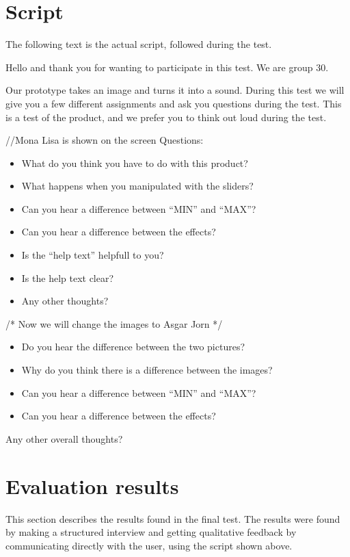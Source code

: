 \section{Script}
The following text is the actual script, followed during the test.

Hello and thank you for wanting to participate in this test. We are group 30.

Our prototype takes an image and turns it into a sound. During this test we will give you a few different assignments and ask you questions during the test. This is a test of the product, and we prefer you to think out loud during the test.

//Mona Lisa is shown on the screen 
Questions: 


\begin{itemize}
\item What do you think you have to do with this product?
\item What happens when you manipulated with the sliders?
\item Can you hear a difference between “MIN” and “MAX”?
\item Can you hear a difference between the effects?
\item Is the “help text” helpfull to you?
\item Is the help text clear?
\item Any other thoughts?
\end{itemize}



/* Now we will change the images to Asgar Jorn */
\begin{itemize}
\item Do you hear the difference between the two pictures?
\item Why do you think there is a difference between the images?
\item Can you hear a difference between “MIN” and “MAX”?
\item Can you hear a difference between the effects?
\end{itemize}


Any other overall thoughts?


\section{Evaluation results}
This section describes the results found in the final test. The results were found by making a structured interview and getting qualitative feedback by communicating directly with the user, using the script shown above. 

